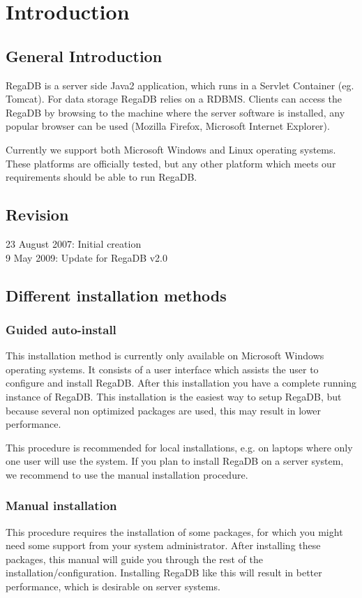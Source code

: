 \chapter{Introduction}
\label{chapter:introduction}

\section{General Introduction}

RegaDB is a server side Java2 application, which runs in a Servlet Container (eg. Tomcat). For data storage RegaDB relies on a RDBMS. Clients can access the RegaDB by browsing to the machine where the server software is installed, any popular browser can be used (Mozilla Firefox, Microsoft Internet Explorer).

Currently we support both Microsoft Windows and Linux operating systems. These platforms are officially tested, but any other platform which meets our requirements should be able to run RegaDB.

\section{Revision}
23 August 2007: Initial creation
\\
9 May 2009: Update for RegaDB v2.0


\section{Different installation methods}
\subsection{Guided auto-install}
This installation method is currently only available on Microsoft Windows operating systems. It consists of a user interface which assists the user to configure and install RegaDB. After this installation you have a complete running instance of RegaDB. This installation is the easiest way to setup RegaDB, but because several non optimized packages are used, this may result in lower performance.

This procedure is recommended for local installations, e.g. on laptops where only one user will use the system. If you plan to install RegaDB on a server system, we recommend to use the manual installation procedure.

\subsection{Manual installation}
This procedure requires the installation of some packages, for which you might need some support from your system administrator. After installing these packages, this manual will guide you through the rest of the installation/configuration. Installing RegaDB like this will result in better performance, which is desirable on server systems.

